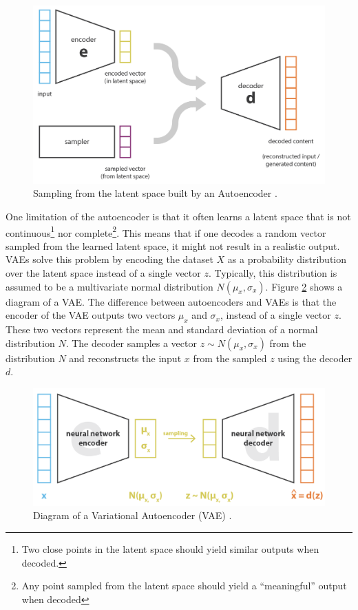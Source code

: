 \begin{figure}[!h]
 \centering
 \includegraphics[width=0.8\columnwidth]{imgs/background/ae_sampling.png}
 \caption{Sampling from the latent space built by an Autoencoder \cite{rocca2019understanding}.}
 \label{fig:ae_sampling}
\end{figure}

One limitation of the autoencoder is that it often learns a latent space that is not continuous\footnote{Two close points in the latent space should yield similar outputs when decoded.} nor complete\footnote{Any point sampled from the latent space should yield a ``meaningful'' output when decoded}. This means that if one decodes a random vector sampled from the learned latent space, it might not result in a realistic output. VAEs solve this problem by encoding the dataset $X$ as a probability distribution over the latent space instead of a single vector $z$. Typically, this distribution is assumed to be a multivariate normal distribution $N(\mu_x, \sigma_x)$. Figure \ref{fig:vae} shows a diagram of a VAE. The difference between autoencoders and VAEs is that the encoder of the VAE outputs two vectors $\mu_x$ and $\sigma_x$, instead of a single vector $z$. These two vectors represent the mean and standard deviation of a normal distribution $N$. The decoder samples a vector $z \sim N(\mu_x, \sigma_x)$ from the distribution $N$ and reconstructs the input $x$ from the sampled $z$ using the decoder $d$.

\begin{figure}[!h]
 \centering
 \includegraphics[width=0.8\columnwidth]{imgs/background/vae.png}
 \caption{Diagram of a Variational Autoencoder (VAE) \cite{rocca2019understanding}.}
 \label{fig:vae}
\end{figure}

